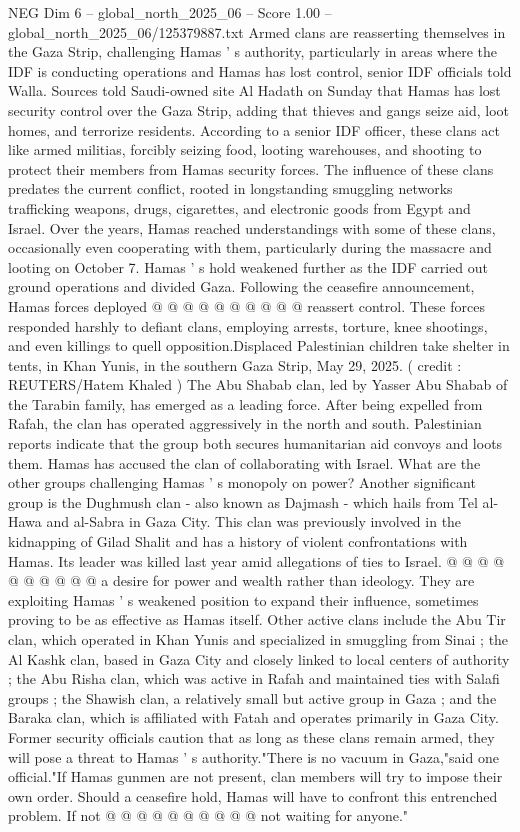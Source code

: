 \begin{textsample}{NEG Dim 6 – global\_north\_2025\_06 – Score 1.00 – global\_north\_2025\_06/125379887.txt}  \label{ex:f6_neg_417}
Armed clans are reasserting themselves in the Gaza Strip, challenging Hamas ' s authority, particularly in areas where the IDF is conducting operations and Hamas has lost control, senior IDF officials told Walla.
Sources told Saudi-owned site Al Hadath on Sunday that Hamas has lost security control over the Gaza Strip, adding that thieves and gangs seize aid, loot homes, and terrorize residents.
According to a senior IDF officer, these clans act like armed militias, forcibly seizing food, looting warehouses, and shooting to protect their members from Hamas security forces.
The influence of these clans predates the current conflict, rooted in longstanding smuggling networks trafficking weapons, drugs, cigarettes, and electronic goods from Egypt and Israel.
Over the years, Hamas reached understandings with some of these clans, occasionally even cooperating with them, particularly during the massacre and looting on October 7.
Hamas ' s hold weakened further as the IDF carried out ground operations and divided Gaza.
Following the ceasefire announcement, Hamas forces deployed @ @ @ @ @ @ @ @ @ @ reassert control.
These forces responded harshly to defiant clans, employing arrests, torture, knee shootings, and even killings to quell opposition.Displaced Palestinian children take shelter in tents, in Khan Yunis, in the southern Gaza Strip, May 29, 2025. ( credit : REUTERS/Hatem Khaled ) The Abu Shabab clan, led by Yasser Abu Shabab of the Tarabin family, has emerged as a leading force.
After being expelled from Rafah, the clan has operated aggressively in the north and south.
Palestinian reports indicate that the group both secures humanitarian aid convoys and loots them.
Hamas has accused the clan of collaborating with Israel.
What are the other groups challenging Hamas ' s monopoly on power?
Another significant group is the Dughmush clan - also known as Dajmash - which hails from Tel al-Hawa and al-Sabra in Gaza City.
This clan was previously involved in the kidnapping of Gilad Shalit and has a history of violent confrontations with Hamas.
Its leader was killed last year amid allegations of ties to Israel. @ @ @ @ @ @ @ @ @ @ a desire for power and wealth rather than ideology.
They are exploiting Hamas ' s weakened position to expand their influence, sometimes proving to be as effective as Hamas itself.
Other active clans include the Abu Tir clan, which operated in Khan Yunis and specialized in smuggling from Sinai ; the Al Kashk clan, based in Gaza City and closely linked to local centers of authority ; the Abu Risha clan, which was active in Rafah and maintained ties with Salafi groups ; the Shawish clan, a relatively small but active group in Gaza ; and the Baraka clan, which is affiliated with Fatah and operates primarily in Gaza City.
Former security officials caution that as long as these clans remain armed, they will pose a threat to Hamas ' s authority."There is no vacuum in Gaza,"said one official."If Hamas gunmen are not present, clan members will try to impose their own order.
Should a ceasefire hold, Hamas will have to confront this entrenched problem.
If not @ @ @ @ @ @ @ @ @ @ not waiting for anyone."

\end{textsample}
